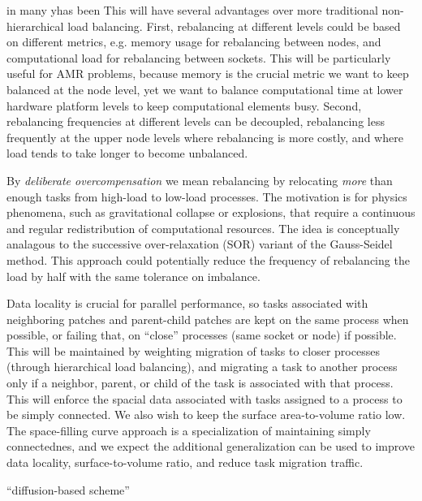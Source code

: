 \documentclass[14pt,letter]{article}
\begin{document}
in many yhas been This will have several advantages
over more traditional non-hierarchical load balancing.  First,
rebalancing at different levels could be based on different metrics,
e.g. memory usage for rebalancing between nodes, and computational
load for rebalancing between sockets.  This will be particularly
useful for AMR problems, because memory is the crucial metric we want
to keep balanced at the node level, yet we want to balance
computational time at lower hardware platform levels to keep
computational elements busy.  Second, rebalancing frequencies at
different levels can be decoupled, rebalancing less frequently at the
upper node levels where rebalancing is more costly, and where load
tends to take longer to become unbalanced.

By \textit{deliberate overcompensation} we mean rebalancing by
relocating \textit{more} than enough tasks from high-load to low-load
processes.  The motivation is for physics phenomena, such as
gravitational collapse or explosions, that require a continuous and
regular redistribution of computational resources.  The idea is
conceptually analagous to the successive over-relaxation (SOR) variant
of the Gauss-Seidel method.  This approach could potentially reduce
the frequency of rebalancing the load by half with the same tolerance
on imbalance.

Data locality is crucial for parallel performance, so tasks associated
with neighboring patches and parent-child patches are kept on the same
process when possible, or failing that, on ``close'' processes (same
socket or node) if possible.  This will be maintained by weighting
migration of tasks to closer processes (through hierarchical load
balancing), and migrating a task to another process only if a
neighbor, parent, or child of the task is associated with that
process.  This will enforce the spacial data associated with tasks
assigned to a process to be simply connected.  We also wish to keep
the surface area-to-volume ratio low.  The space-filling curve
approach is a specialization of maintaining simply connectednes, and
we expect the additional generalization can be used to improve data
locality, surface-to-volume ratio, and reduce task migration traffic.

``diffusion-based scheme''
\end{document}
